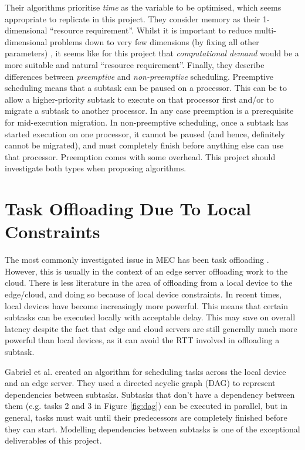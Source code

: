 \documentclass[]{UCD_CS_Interim_Report}
\begin{document}
Their algorithms prioritise \textit{time} as the variable to be optimised, which seems appropriate to replicate in this project. They consider memory as their 1-dimensional \enquote{resource requirement}. Whilst it is important to reduce multi-dimensional problems down to very few dimensions (by fixing all other parameters) \cite{chipman2021letspracticepreachplanning}, it seems like for this project that \textit{computational demand} would be a more suitable and natural \enquote{resource requirement}.
\newpage
Finally, they describe differences between \textit{preemptive} and \textit{non-preemptive} scheduling. Preemptive scheduling means that a subtask can be paused on a processor. This can be to allow a higher-priority subtask to execute on that processor first and/or to migrate a subtask to another processor. In any case preemption is a prerequisite for mid-execution migration. In non-preemptive scheduling, once a subtask has started execution on one processor, it cannot be paused (and hence, definitely cannot be migrated), and must completely finish before anything else can use that processor. Preemption comes with some overhead. This project should investigate both types when proposing algorithms.

\section{Task Offloading Due To Local Constraints} \label{Task Offloading Due To Local Constraints}
The most commonly investigated issue in MEC has been task offloading \cite{mohammad2023offloading}. However, this is usually in the context of an edge server offloading work to the cloud. There is less literature in the area of offloading from a local device to the edge/cloud, and doing so because of local device constraints. In recent times, local devices have become increasingly more powerful. This means that certain subtasks can be executed locally with acceptable delay. This may save on overall latency despite the fact that edge and cloud servers are still generally much more powerful than local devices, as it can avoid the RTT involved in offloading a subtask.

Gabriel et al. \cite{gabriel2024dag} created an algorithm for scheduling tasks across the local device and an edge server. They used a directed acyclic graph (DAG) to represent dependencies between subtasks. Subtasks that don't have a dependency between them (e.g. tasks 2 and 3 in Figure \ref{fig:dag}) can be executed in parallel, but in general, tasks must wait until their predecessors are completely finished before they can start. Modelling dependencies between subtasks is one of the exceptional deliverables of this project.
\end{document}
